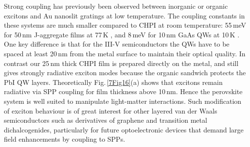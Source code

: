 Strong coupling has previously been observed between inorganic or organic excitons and Au nanoslit gratings at low temperature. The coupling constants in these systems are much smaller compared to CHPI at room temperature: 55\,meV for 50\,nm J-aggregate films at 77\,K \cite{Vasa2010}, and 8\,meV for 10\,nm GaAs QWs at 10\,K \cite{Vasa2008}. One key difference is that for the III-V semiconductors the QWs have to be spaced at least 20\,nm from the metal surface to maintain their optical quality. In contrast our 25\,nm thick CHPI film is prepared directly on the metal, and still gives strongly radiative exciton modes because the organic sandwich protects the PbI QW layers. Theoretically Fig.\,\ref{7Fig16}(a) shows that excitons remain radiative via SPP coupling for film thickness above 10\,nm. Hence the perovskite system is well suited to manipulate light-matter interactions. Such modification of exciton behaviour is of great interest for other layered van der Waals semiconductors such as derivatives of graphene and transition metal dichalcogenides, particularly for future optoelectronic devices that demand large field enhancements by coupling to SPPs.